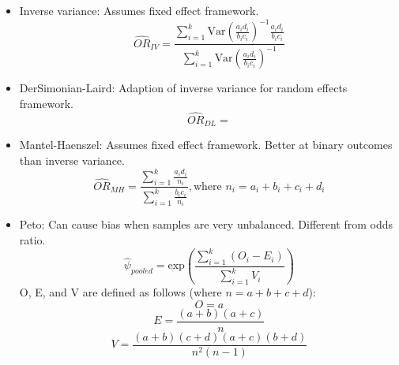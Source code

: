 \documentclass{article}
\begin{document}
\begin{itemize}
    \item Inverse variance: Assumes fixed effect framework.
        \begin{equation}
            \hat{OR}_{IV} = \frac{\sum_{i=1}^k \text{Var}(\frac{a_i d_i}{b_i c_i})^{-1} \frac{a_i d_i}{b_i c_i}}{\sum_{i=1}^k \text{Var}(\frac{a_i d_i}{b_i c_i})^{-1}} 
        \end{equation} 

    \item DerSimonian-Laird: Adaption of inverse variance for random effects framework.
        \begin{equation}
            \hat{OR}_{DL} =
        \end{equation} 
        
    \item Mantel-Haenszel: Assumes fixed effect framework. Better at binary outcomes than inverse variance.
        \begin{equation}
            \hat{OR}_{MH} = \frac{\sum_{i=1}^k \frac{a_i d_i}{n_i}}{\sum_{i=1}^k \frac{b_i c_i}{n_i}}, \text{where } n_i = a_i + b_i + c_i + d_i
        \end{equation}    
        
    \item Peto: Can cause bias when samples are very unbalanced. Different from odds ratio. 
        \begin{equation}
            \hat{\psi}_{pooled} = \text{exp}(\frac{\sum_{i=1}^k (O_i - E_i)}{\sum_{i=1}^k V_i})
        \end{equation} 
        O, E, and V are defined as follows (where $n = a+b+c+d$):
        \begin{equation}
            O = a
        \end{equation}
        \begin{equation}
            E = \frac{(a+b)(a+c)}{n}
        \end{equation}
        \begin{equation}
            V = \frac{(a+b)(c+d)(a+c)(b+d)}{n^2(n-1)}
        \end{equation}
        
\end{itemize}
\end{document}
